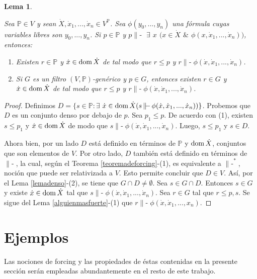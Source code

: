 \documentclass[11pt]{unam_tesis1}
\theoremstyle{MyThmStyle}
\theoremstyle{definition}
\theoremstyle{plain}
\newtheorem{lemma}[definition]{Lema}
\theoremstyle{remark}
\def\dom{\mathop{\rm dom}\nolimits}
\def\forces{\mathop{\parallel\!\!\!-}\nolimits}
\let\Vdash\forces
\let\leq\leqslant
\begin{document}
\begin{lemma}\label{nombreeneldominio}

Sea $\mathbb P\in V$ y sean $\dot X, \dot x_1,...,\dot x_n\in V^{\mathbb P}$. Sea $\phi(y_0,...,y_n)$ una f\'ormula cuyas variables libres son $y_0,...,y_n$. Si $p\in \mathbb P$ y $p\Vdash$ $\exists$ $x$ $(x\in \dot X$ $\&$ $\phi(x,\dot x_1,...,\dot x_n))$, entonces:

\begin{enumerate}
\item Existen $r\in \mathbb P$ y $\dot x\in \dom \dot X$ de tal modo que $r\leq p$ y  $r\Vdash \phi (\dot x,\dot x_1,...,\dot x_n)$.
\item Si $G$ es un filtro $(V,\mathbb P)$-gen\'erico y $p\in G$, entonces existen $r\in G$ y $\dot x\in \dom \dot X$ de tal modo que $r\leq p$ y $r\Vdash \phi (\dot x,\dot x_1,...,\dot x_n)$.
\end{enumerate}

\end{lemma}

\begin{proof}
Definimos $D=\{s\in \mathbb P: \exists$ $\dot x\in \dom \dot X(s\Vdash \phi(\dot x,\dot x_1,...,\dot x_n)) \}$. Probemos que $D$ es un conjunto denso por debajo de $p$. Sea $p_1\leq p$. De acuerdo con (1), existen $s\leq p_1$ y $\dot x\in \dom \dot X$ de modo que $s\Vdash \phi(\dot x,\dot x_1,...,\dot x_n)$. Luego, $s\leq p_1$ y $s\in D$.

Ahora bien, por un lado $D$ est\'a definido en t\'erminos de $\mathbb P$ y $\dom \dot X$, conjuntos que son elementos de $V$. Por otro lado, $D$ tambi\'en est\'a definido en t\'erminos de $\Vdash$, la cual, seg\'un el Teorema \ref{teoremadeforcing}-(1), es equivalente a $\Vdash^*$, noci\'on que puede ser relativizada a $V$. Esto permite concluir que $D\in V$. As\'i, por el Lema \ref{lemadenso}-(2), se tiene que $G\cap D\neq \emptyset$. Sea $s\in G\cap D$. Entonces $s\in G$ y existe $\dot x\in \dom \dot X$ tal que $s\Vdash \phi(\dot x,\dot x_1,...,\dot x_n)$. Sea $r\in G$ tal que $r\leq p,s$. Se sigue del Lema \ref{alguienmasfuerte}-(1) que $r\Vdash \phi(\dot x,\dot x_1,...,x_n)$.
\end{proof}

\section{Ejemplos}

Las nociones de forcing y las propiedades de \'estas contenidas en la presente secci\'on ser\'an empleadas abundantemente en el resto de este trabajo.
\end{document}
